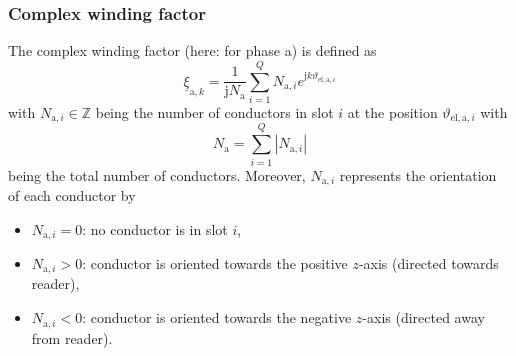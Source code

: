 \begin{frame}
	\frametitle{Complex winding factor}
    The complex winding factor (here: for phase a) is defined as
    \begin{equation}
        \underline{\xi}_{\mathrm{a},k} = \frac{1}{\mathrm{j}N_\mathrm{a}}\sum_{i=1}^{Q} N_{\mathrm{a},i}e^{\mathrm{j}k\vartheta_{\mathrm{el},\mathrm{a},i}}
        \label{eq:Complex_winding_factor_definition}
    \end{equation} 
    with $N_{\mathrm{a},i}\in \mathbb{Z}$ being the number of conductors in slot $i$ at the position $\vartheta_{\mathrm{el},\mathrm{a},i}$ with 
    \begin{equation}
        N_\mathrm{a} = \sum_{i=1}^{Q} |N_{\mathrm{a},i}|
        \label{eq:Complex_winding_factor_total_number_conductors}
    \end{equation}
    being the total number of conductors. Moreover, $N_{\mathrm{a},i}$ represents the orientation of each conductor by
    \begin{itemize}
        \item $N_{\mathrm{a},i} = 0$: no conductor is in slot $i$,
        \item $N_{\mathrm{a},i} >0 $: conductor is oriented towards the positive $z$-axis (directed towards reader),
        \item $N_{\mathrm{a},i} <0 $: conductor is oriented towards the negative $z$-axis (directed away from reader).
    \end{itemize}
\end{frame}

